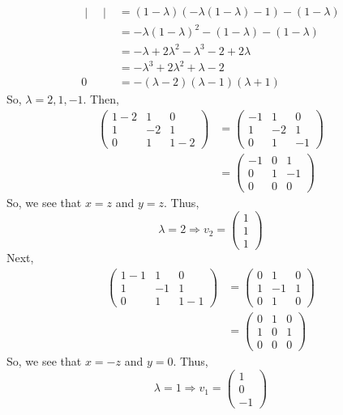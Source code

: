 \documentclass[letterpaper,10pt]{article}
\begin{document}
\begin{description}
\begin{enumerate}[label=\alph*.]
\begin{align*}
\begin{vmatrix}
\end{vmatrix} &= (1-\lambda)(-\lambda(1-\lambda)-1)-(1-\lambda)\\
&= -\lambda(1-\lambda)^2-(1-\lambda)-(1-\lambda)\\
&= -\lambda+2\lambda^2-\lambda^3-2+2\lambda\\
&=-\lambda^3+2\lambda^2+\lambda-2\\
0 &= -(\lambda-2)(\lambda-1)(\lambda+1)
\end{align*}
So, $\lambda=2,1,-1$. Then,
\begin{align*}
\begin{pmatrix}
1-2 & 1 & 0\\
1 & -2 & 1\\
0 & 1 & 1-2
\end{pmatrix} &= \begin{pmatrix}
-1 & 1 & 0\\
1 & -2 & 1\\
0 & 1 & -1
\end{pmatrix}\\
&= \begin{pmatrix}
-1 & 0 & 1\\
0 & 1 & -1\\
0 & 0 & 0
\end{pmatrix}
\end{align*}
So, we see that $x=z$ and $y=z$. Thus,
\[\lambda=2\Rightarrow v_2=\begin{pmatrix}
1\\1\\1
\end{pmatrix}\]
Next,
\begin{align*}
\begin{pmatrix}
1-1 & 1 & 0\\
1 & -1 & 1\\
0 & 1 & 1-1
\end{pmatrix} &= \begin{pmatrix}
0 & 1 & 0\\
1 & -1 & 1\\
0 & 1 & 0
\end{pmatrix}\\
&= \begin{pmatrix}
0 & 1 & 0\\
1 & 0 & 1\\
0 & 0 & 0
\end{pmatrix}
\end{align*}
So, we see that $x=-z$ and $y=0$. Thus,
\[\lambda=1\Rightarrow v_1=\begin{pmatrix}
1\\0\\-1

\end{pmatrix}\]
\end{enumerate}
\end{description}
\end{document}
